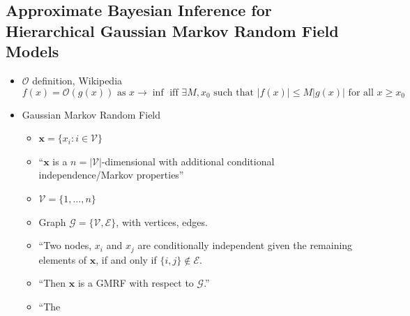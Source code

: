 \documentclass{article}
\begin{document}
\subsection*{Approximate Bayesian Inference for Hierarchical Gaussian Markov Random Field Models \citep{Rue2007}}
\begin{itemize}
\item $\mathcal{O}$ definition, Wikipedia
$$f(x) = \mathcal{O}(g(x)) \text{ as } x \rightarrow \inf \text{ iff } \exists M, x_{0} \text{ such that } |f(x)| \leq M|g(x)| \text{ for all } x \geq x_{0}$$
\item Gaussian Markov Random Field 
  \begin{itemize}
  \item $\pmb{x} = \{ x_{i}:i \in \mathscr{V} \}$
  \item ``$\pmb{x}$ is a $n = |\mathscr{V}|$-dimensional with additional conditional independence/Markov properties'' 
  \item $\mathscr{V} = \{1,\dots,n\}$
  \item Graph $\mathscr{G} = \{ \mathscr{V}, \mathscr{E} \}$, with vertices, edges.
  \item ``Two nodes, $x_{i}$ and $x_{j}$ are conditionally independent given the remaining elements of $\pmb{x}$, if and only if $\{i, j\} \notin \mathscr{E}$.
  \item ``Then $\pmb{x}$ is a GMRF with respect to $\mathscr{G}$.''
  \item ``The 
  \end{itemize}
  
  


\end{itemize}
\end{document}

